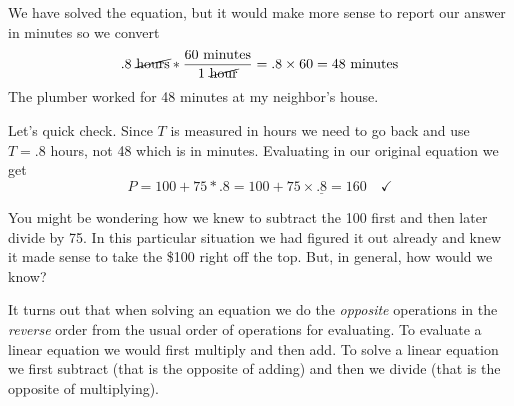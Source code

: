 We have solved the equation, but it would make more sense to report our answer in minutes so we convert $$.8 \text{ \cancel{hours}} \ast \frac{60 \text{ minutes}}{1 \text{ \cancel{hour}}} = .8 \times 60 = 48 \text{ minutes}$$  The plumber worked for 48 minutes at my neighbor's house.

Let's quick check.  Since $T$ is measured in hours we need to go back and use $T= .8$ hours, not 48 which is in minutes.  Evaluating in our original equation we get $$P=100 + 75 \ast .8 = 100+75\times\underline{.8}= 160 \quad \checkmark$$  

You might be wondering how we knew to subtract the 100 first and then later divide by 75.  In this particular situation we had figured it out already and knew it made sense to take the \$100 right off the top.  But, in general, how would we know?  

It turns out that when solving an equation we do the \emph{opposite} operations in the \emph{reverse} order from the usual order of operations for evaluating.  To evaluate a linear equation we would first multiply and then add.  To solve a linear equation we first subtract (that is the opposite of adding) and then we divide (that is the opposite of multiplying).  %

 
